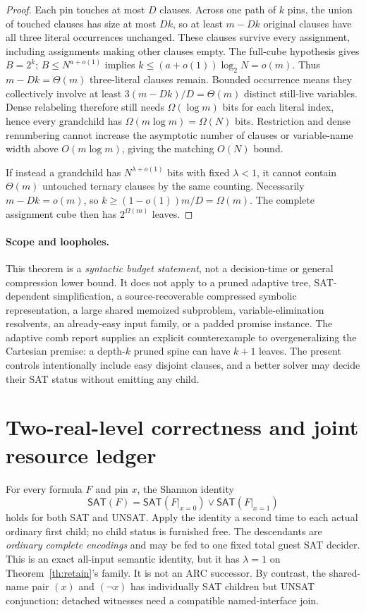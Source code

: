 \documentclass[11pt]{article}
\newcommand{\SAT}{\mathsf{SAT}}
\begin{document}
\begin{proof}
Each pin touches at most $D$ clauses. Across one path of $k$ pins, the union of touched clauses has size at most $Dk$, so at least $m-Dk$ original clauses have all three literal occurrences unchanged. These clauses survive every assignment, including assignments making other clauses empty. The full-cube hypothesis gives $B=2^k$; $B\le N^{a+o(1)}$ implies $k\le(a+o(1))\log_2 N=o(m)$. Thus $m-Dk=\Theta(m)$ three-literal clauses remain. Bounded occurrence means they collectively involve at least $3(m-Dk)/D=\Theta(m)$ distinct still-live variables. Dense relabeling therefore still needs $\Omega(\log m)$ bits for each literal index, hence every grandchild has $\Omega(m\log m)=\Omega(N)$ bits. Restriction and dense renumbering cannot increase the asymptotic number of clauses or variable-name width above $O(m\log m)$, giving the matching $O(N)$ bound.

If instead a grandchild has $N^{\lambda+o(1)}$ bits with fixed $\lambda<1$, it cannot contain $\Theta(m)$ untouched ternary clauses by the same counting. Necessarily $m-Dk=o(m)$, so $k\ge (1-o(1))m/D=\Omega(m)$. The complete assignment cube then has $2^{\Omega(m)}$ leaves.
\end{proof}

\paragraph{Scope and loopholes.}
This theorem is a \emph{syntactic budget statement}, not a decision-time or general compression lower bound. It does not apply to a pruned adaptive tree, SAT-dependent simplification, a source-recoverable compressed symbolic representation, a large shared memoized subproblem, variable-elimination resolvents, an already-easy input family, or a padded promise instance. The adaptive comb report supplies an explicit counterexample to overgeneralizing the Cartesian premise: a depth-$k$ pruned spine can have $k+1$ leaves. The present controls intentionally include easy disjoint clauses, and a better solver may decide their SAT status without emitting any child.

\section{Two-real-level correctness and joint resource ledger}
For every formula $F$ and pin $x$, the Shannon identity
\[
\SAT(F)=\SAT(F|_{x=0})\vee\SAT(F|_{x=1})
\]
holds for both SAT and UNSAT. Apply the identity a second time to each actual ordinary first child; no child status is furnished free. The descendants are \emph{ordinary complete encodings} and may be fed to one fixed total guest SAT decider. This is an exact all-input semantic identity, but it has $\lambda=1$ on Theorem~\ref{th:retain}'s family. It is not an ARC successor. By contrast, the shared-name pair $(x)$ and $(\neg x)$ has individually SAT children but UNSAT conjunction: detached witnesses need a compatible named-interface join.
\end{document}
